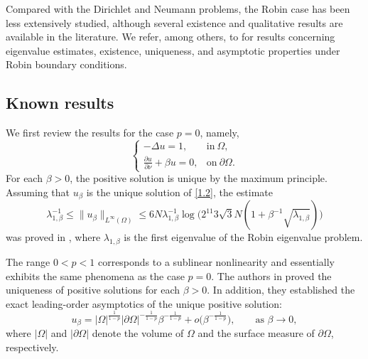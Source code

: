\documentclass[12pt,reqno]{amsart}
\numberwithin{equation}{section}
\theoremstyle{definition}
\begin{document}
Compared with the Dirichlet and Neumann problems, the Robin case has been less extensively studied, although several existence and qualitative results are available in the literature. We refer, among others, to \cite{CGL,D1,D2,DF,W,vB,GS,F,BBBT} for results concerning eigenvalue estimates, existence, uniqueness, and asymptotic properties under Robin boundary conditions.



\subsection{Known results}
We first review the results for the case $p=0$, namely, 
\begin{equation}\label{1.2}
\begin{cases}
-\Delta u=1,\quad &\text{in}\ \Omega,\\
\frac{\partial u}{\partial \nu}+\beta u=0, &\text{on}\ \partial \Omega.
\end{cases}
\end{equation}
For each $\beta>0$, the positive solution is unique by the maximum principle. Assuming that $u_\beta$ is the unique solution of \eqref{1.2}, the estimate 
\begin{equation*}
\lambda_{1,\beta}^{-1}\leq \|u_\beta\|_{L^\infty(\Omega)}\leq
6N\lambda_{1,\beta}^{-1}\log\bigl(2^{11}3\sqrt{3}N(1+\beta^{-1}\sqrt{\lambda_{1,\beta}})\bigr)
\end{equation*}
was proved in \cite{vB}, where $\lambda_{1,\beta}$ is the first eigenvalue of the Robin eigenvalue problem.

The range $0<p<1$ corresponds to a sublinear nonlinearity and essentially exhibits the same phenomena as the case $p=0$. The authors in \cite{CGL} proved the uniqueness of positive solutions for each $\beta>0$. In addition, they established the exact leading-order asymptotics of the unique positive solution:
\[
u_\beta=
|\Omega|^{\frac{1}{1-p}}|\partial\Omega|^{-\frac{1}{1-p}}
\beta^{-\frac{1}{1-p}}
+o\bigl(\beta^{-\frac{1}{1-p}}\bigr),
\qquad \text{as }\beta\to0,
\]
where $|\Omega|$ and $|\partial\Omega|$ denote the volume of $\Omega$ and the surface measure of $\partial\Omega$, respectively.
\end{document}
